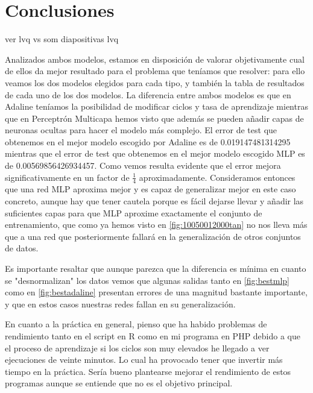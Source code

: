 \documentclass[11pt,spanish,listoffigures,listoftables]{workluis}
\begin{document}
\chapter{Conclusiones}

ver lvq vs som diapositivas lvq

\par Analizados ambos modelos, estamos en disposición de valorar objetivamente cual de ellos da mejor resultado para el problema que teníamos que resolver: para ello veamos los dos modelos elegidos para cada tipo, y también la tabla de resultados de cada uno de los dos modelos. La diferencia entre ambos modelos es que en Adaline teníamos la posibilidad de modificar ciclos y tasa de aprendizaje mientras que en Perceptrón Multicapa hemos visto que además se pueden añadir capas de neuronas ocultas para hacer el modelo más complejo. El error de test que obtenemos en el mejor modelo escogido por Adaline es de 0.019147481314295 mientras que el error de test que obtenemos en el mejor modelo escogido MLP es de 0.00569856426934457. Como vemos resulta evidente que el error mejora significativamente en un factor de $\frac{1}{4}$ aproximadamente. Consideramos entonces que una red MLP aproxima mejor y es capaz de generalizar mejor en este caso concreto, aunque hay que tener cautela porque es fácil dejarse llevar y añadir las suficientes capas para que MLP aproxime exactamente el conjunto de entrenamiento, que como ya hemos visto en \ref{fig:10050012000tan} no nos lleva más que a una red que posteriormente fallará en la generalización de otros conjuntos de datos.

\par Es importante resaltar que aunque parezca que la diferencia es mínima en cuanto se "desnormalizan" los datos vemos que algunas salidas tanto en \ref{fig:bestmlp} como en \ref{fig:bestadaline} presentan errores de una magnitud bastante importante, y que en estos casos nuestras redes fallan en su generalización.

\par En cuanto a la práctica en general, pienso que ha habido problemas de rendimiento tanto en el script en R como en mi programa en PHP debido a que el proceso de aprendizaje si los ciclos son muy elevados he llegado a ver ejecuciones de veinte minutos. Lo cual ha provocado tener que invertir más tiempo en la práctica. Sería bueno plantearse mejorar el rendimiento de estos programas aunque se entiende que no es el objetivo principal.

\end{document}
